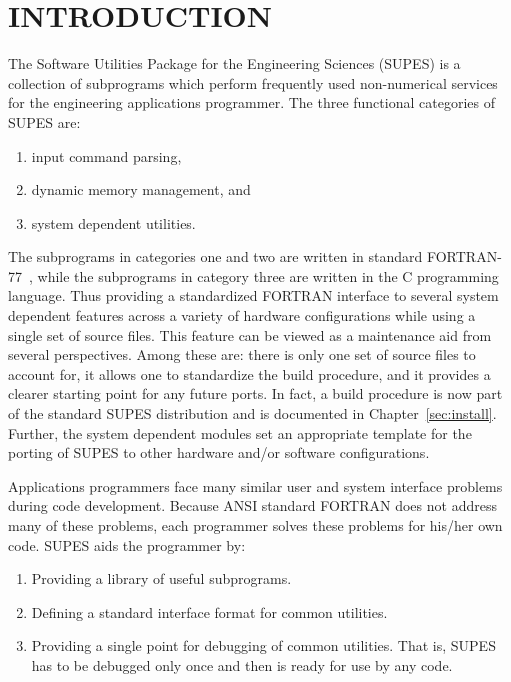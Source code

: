 \chapter{INTRODUCTION}
The Software Utilities Package for the Engineering
Sciences (SUPES) is a collection of subprograms which perform frequently
used non-numerical services for the engineering applications programmer.
The
three functional categories of SUPES are: 

\begin{enumerate}

\item input command parsing,

\item dynamic memory management, and 

\item system dependent utilities.

\end{enumerate}

The subprograms in categories one and two are written in standard
FORTRAN-77~\cite{ansi}, while the subprograms in category three are
written in the C programming language.  Thus providing a standardized
FORTRAN interface to several system dependent features across a
variety of hardware configurations while using a single set of source
files.  This feature can be viewed as a maintenance aid from several
perspectives.  Among these are: there is only one set of source files
to account for, it allows one to standardize the build procedure, and
it provides a clearer starting point for any future ports.  In fact, a
build procedure is now part of the standard SUPES distribution and is
documented in Chapter~\ref{sec:install}.  Further, the system
dependent modules set an appropriate template for the porting of SUPES
to other hardware and/or software configurations.

Applications programmers face many similar user and system interface problems
during code development.  Because ANSI standard FORTRAN does not address many of
these problems, each programmer solves these problems for his/her own code.
SUPES aids the programmer by:
\begin{enumerate}

\item Providing a library of useful subprograms.

\item Defining a standard interface format for common utilities.

\item Providing a single point for debugging of common utilities.  That
is, SUPES has to be debugged only once and then is ready for use
by any code.
\end{enumerate}


